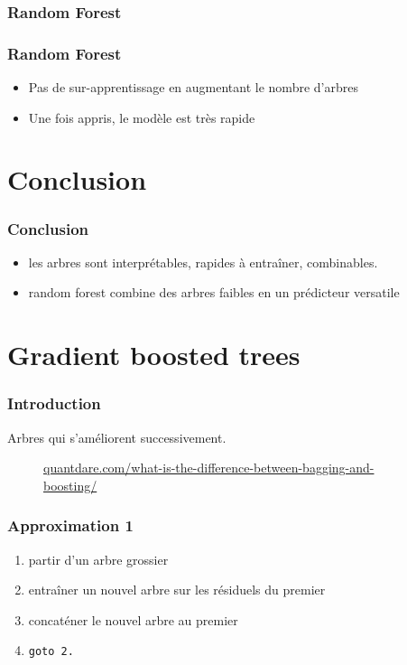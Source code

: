 \documentclass{formation}
\begin{document}
\begin{frame}
  \frametitle{Random Forest}
\end{frame}

\begin{frame}
  \frametitle{Random Forest}
  \begin{itemize}
  \item Pas de sur-apprentissage en augmentant le nombre d'arbres
  \item Une fois appris, le modèle est très rapide
  \end{itemize}
\end{frame}

\section{Conclusion}
\begin{frame}
  \frametitle{Conclusion}
  \begin{itemize}
  \item les arbres sont interprétables, rapides à entraîner,
    combinables.
  \item random forest combine des arbres faibles en un prédicteur
    versatile
  \end{itemize}
\end{frame}

\section{Gradient boosted trees}

\begin{frame}
  \frametitle{Introduction}

  Arbres qui s'améliorent successivement.
  \begin{figure}
    \centering {}
    \scriptsize{\href{https://quantdare.com/what-is-the-difference-between-bagging-and-boosting/}%
        {quantdare.com/what-is-the-difference-between-bagging-and-boosting/}}
  \end{figure}
\end{frame}

\begin{frame}
  \frametitle{Approximation 1}

  \begin{enumerate}
  \item partir d'un arbre grossier
  \item entraîner un nouvel arbre sur les résiduels du premier
  \item concaténer le nouvel arbre au premier
  \item \texttt{goto 2.}
  \end{enumerate}

\end{frame}
\end{document}
